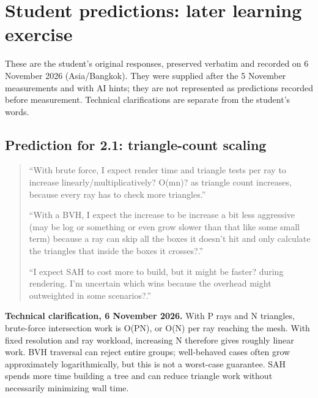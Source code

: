 \documentclass[11pt,a4paper]{article}
\begin{document}
\section{Student predictions: later learning exercise}
These are the student's original responses, preserved verbatim and recorded on 6 November 2026 (Asia/\allowbreak{}Bangkok). They were supplied after the 5 November measurements and with AI hints; they are not represented as predictions recorded before measurement. Technical clarifications are separate from the student's words.


\subsection*{Prediction for 2.1: triangle-count scaling}
\begin{quote}\small
``With brute force, I expect render time and triangle tests per ray to increase linearly/\allowbreak{}multiplicatively? O(mn)? as triangle count increases, because every ray has to check more triangles.''


``With a BVH, I expect the increase to be increase a bit less aggressive (may be log or something or even grow slower than that like some small term) because a ray can skip all the boxes it doesn't hit and only calculate the triangles that inside the boxes it crosses?.''


``I expect SAH to cost more to build, but it might be faster? during rendering. I'm uncertain which wins because the overhead might outweighted in some scenarios?.''

\end{quote}
\textbf{Technical clarification, 6 November 2026.} With P rays and N triangles, brute-force intersection work is O(PN), or O(N) per ray reaching the mesh. With fixed resolution and ray workload, increasing N therefore gives roughly linear work. BVH traversal can reject entire groups; well-behaved cases often grow approximately logarithmically, but this is not a worst-case guarantee. SAH spends more time building a tree and can reduce triangle work without necessarily minimizing wall time.
\end{document}
